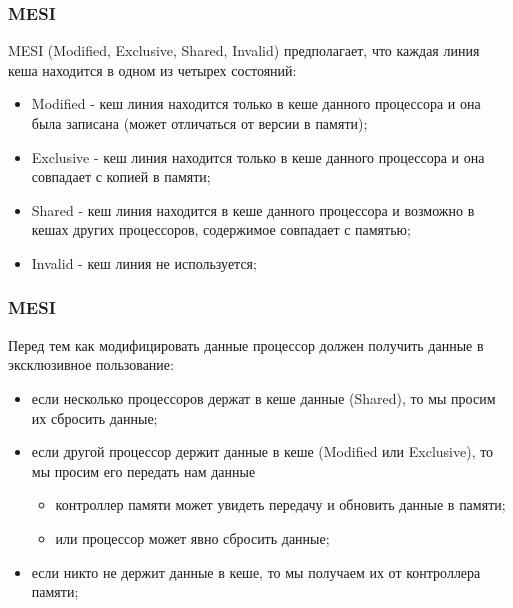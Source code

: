 \begin{frame}
\frametitle{MESI}
MESI (Modified, Exclusive, Shared, Invalid) предполагает, что каждая линия кеша
находится в одном из четырех состояний:
\begin{itemize}
  \item Modified - кеш линия находится только в кеше данного процессора и она
        была записана (может отличаться от версии в памяти);
  \item Exclusive - кеш линия находится только в кеше данного процессора и она
        совпадает с копией в памяти;
  \item Shared - кеш линия находится в кеше данного процессора и возможно в
        кешах других процессоров, содержимое совпадает с памятью;
  \item Invalid - кеш линия не используется;
\end{itemize}
\end{frame}

\begin{frame}
\frametitle{MESI}
Перед тем как модифицировать данные процессор должен получить данные в
эксклюзивное пользование:
\begin{itemize}
  \item если несколько процессоров держат в кеше данные (Shared), то мы просим
        их сбросить данные;
  \item если другой процессор держит данные в кеше (Modified или Exclusive), то
        мы просим его передать нам данные
        \begin{itemize}
          \item контроллер памяти может увидеть передачу и обновить данные в
                памяти;
          \item или процессор может явно сбросить данные;
        \end{itemize}
  \item если никто не держит данные в кеше, то мы получаем их от контроллера
        памяти;
\end{itemize}
\end{frame}
